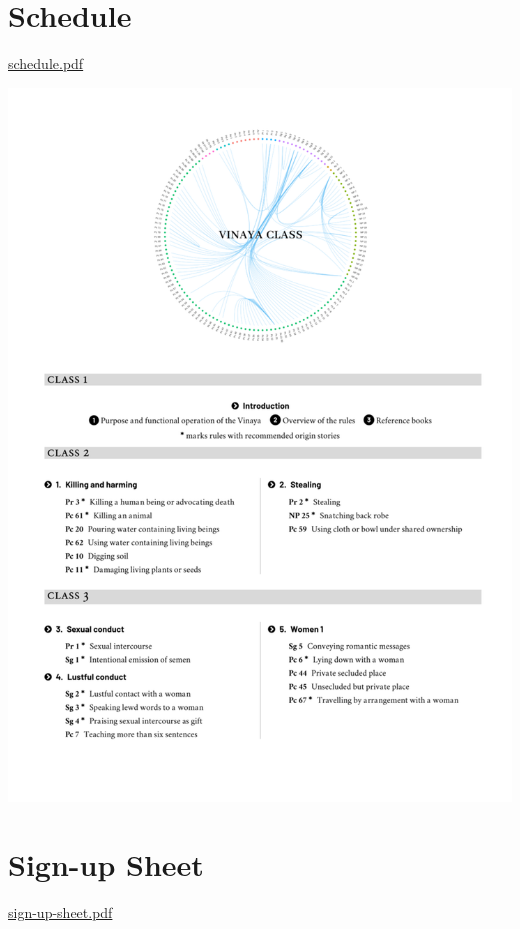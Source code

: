 \section{Schedule}

\href{./includes/docs/schedule.pdf}{schedule.pdf}

\href{./includes/docs/schedule.pdf}{\includegraphics{./includes/docs/schedule-thumb.png}}

\section{Sign-up Sheet}

\href{./includes/docs/sign-up-sheet.pdf}{sign-up-sheet.pdf}

